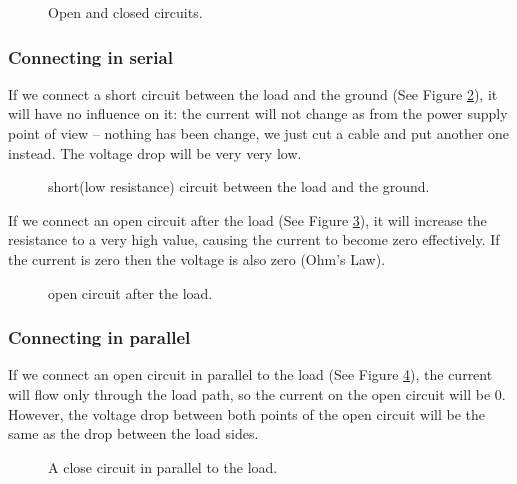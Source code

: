 \begin{figure}[!ht]
    \centering
    
    \caption{Open and closed circuits.} \label{fig:open_closed_circuits}
\end{figure}

\subsubsection{Connecting in serial}

If we connect a short circuit between the load and the ground (See Figure
\ref{fig:circuit1}), it will have no influence on it: the current will not
change as from the power supply point of view – nothing has been change, we just
cut a cable and put another one instead. The voltage drop will be very very low.

\begin{figure}[!ht]
    \centering
    
    \caption{short(low resistance) circuit between the load and the ground.} \label{fig:circuit1}
\end{figure}

If we connect an open circuit after the load (See Figure \ref{fig:circuit2}), it
will increase the resistance to a very high value, causing the current to become
zero effectively. If the current is zero then the voltage is also zero (Ohm's
Law).

\begin{figure}[!ht]
    \centering
    
    \caption{open circuit after the load.} \label{fig:circuit2}
\end{figure}

\subsubsection{Connecting in parallel}

If we connect an open circuit in parallel to the load (See Figure
\ref{fig:circuit3}), the current will flow only through the load path, so the
current on the open circuit will be 0. However, the voltage drop between both
points of the open circuit will be the same as the drop between the load sides.

\begin{figure}[!ht]
    \centering
    
    \caption{A close circuit in parallel to the load.} \label{fig:circuit3}
\end{figure}

